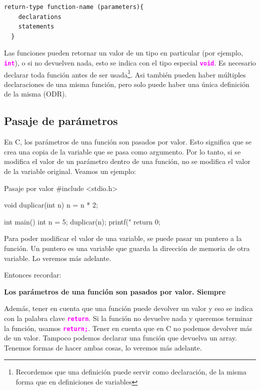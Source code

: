 \documentclass[]{scrartcl}
\newcommand{\hl}[1]{\textcolor{magenta}{\textbf{\texttt{#1}}}}
\begin{document}
\begin{center}
  \begin{Verbatim}[fontshape=it]
  return-type function-name (parameters){
    declarations
    statements
  }	
  \end{Verbatim}
\end{center}

Las funciones pueden retornar un valor de un tipo en particular (por ejemplo, \hl{int}), o si no devuelven nada, esto se indica con el tipo especial \hl{void}. Es necesario declarar toda función antes de ser usada\footnote{Recordemos que una definición puede servir como declaración, de la misma forma que en definiciones de variables}. Asi también pueden haber múltiples declaraciones de una misma función, pero solo puede haber una única definición de la misma (ODR).

\subsection*{Pasaje de parámetros}

En C, los parámetros de una función son pasados por valor. Esto significa que se crea una copia de la variable que se pasa como argumento. Por lo tanto, si se modifica el valor de un parámetro dentro de una función, no se modifica el valor de la variable original. Veamos un ejemplo:

\begin{cbox}[]{Pasaje por valor}
  #include <stdio.h>
  
  void duplicar(int n) {
    n = n * 2;
  }
  
  int main() {
    int n = 5;
    duplicar(n);
    printf("%
    return 0;
  }
\end{cbox}

Para poder modificar el valor de una variable, se puede pasar un puntero a la función. Un puntero es una variable que guarda la dirección de memoria de otra variable. Lo veremos más adelante.

Entonces recordar:

\begin{importantbox}
  \centering
  \textbf{Los parámetros de una función son pasados por valor. Siempre}
\end{importantbox}

Además, tener en cuenta que una función puede devolver un valor y eso se indica con la palabra clave \hl{return}. Si la función no devuelve nada y queremos terminar la función, usamos \hl{return;}. Tener en cuenta que en C no podemos devolver más de un valor. Tampoco podemos declarar una función que devuelva un array. Tenemos formas de hacer ambas cosas, lo veremos más adelante.
\end{document}
